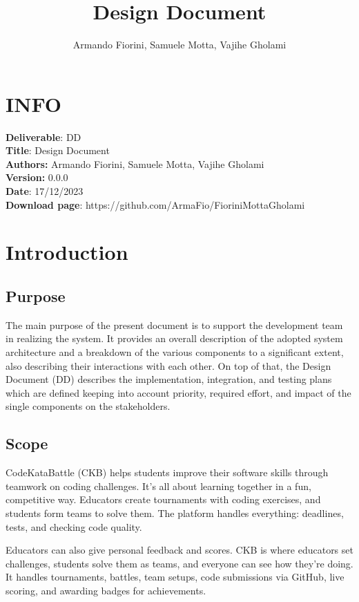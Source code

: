 \documentclass{article}
\title{\textbf{Design Document}}
\author{Armando Fiorini, Samuele Motta, Vajihe Gholami}
\date{}
\begin{document}
\maketitle
\section*{INFO}
\textbf{Deliverable}: DD\\
\textbf{Title}: Design Document\\
\textbf{Authors:} Armando Fiorini, Samuele Motta, Vajihe Gholami\\
\textbf{Version:} 0.0.0\\
\textbf{Date}: 17/12/2023\\
\textbf{Download page}: https://github.com/ArmaFio/FioriniMottaGholami\\
\newpage
\tableofcontents
\newpage

\section{Introduction}
\subsection{Purpose}
The main purpose of the present document is to support the development team in realizing the system. It provides an overall description of the adopted system architecture and a breakdown of the various components to a significant extent, also describing their interactions with each other. On top of that, the Design Document (DD) describes the implementation, integration, and testing plans which are defined keeping into account priority, required effort, and impact of the single components on the stakeholders.

\subsection{Scope}
CodeKataBattle (CKB) helps students improve their software skills through teamwork on coding challenges. It's all about learning together in a fun, competitive way. Educators create tournaments with coding exercises, and students form teams to solve them. The platform handles everything: deadlines, tests, and checking code quality.

Educators can also give personal feedback and scores. CKB is where educators set challenges, students solve them as teams, and everyone can see how they're doing. It handles tournaments, battles, team setups, code submissions via GitHub, live scoring, and awarding badges for achievements.
\end{document}
